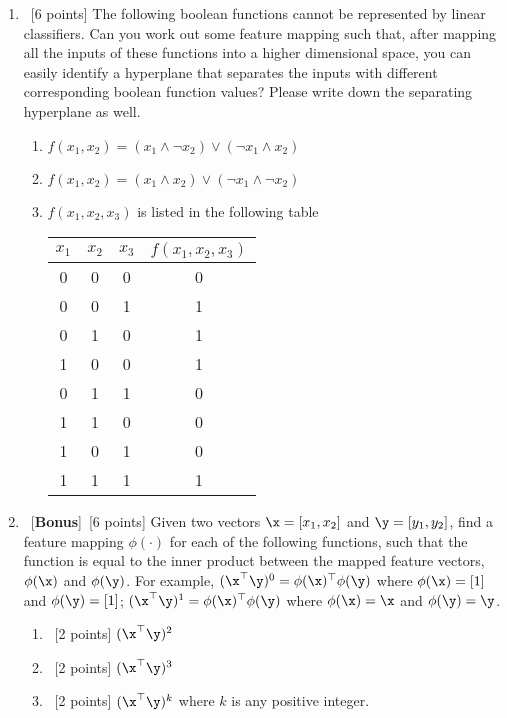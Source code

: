 \documentclass[12pt, fullpage,letterpaper]{article}
\begin{document}
\begin{enumerate}
	
	\item~[6 points] The following boolean functions cannot be represented by linear classifiers. Can you work out some feature mapping such that, after mapping all the inputs of these functions into a higher dimensional space, you can easily identify a hyperplane that separates the inputs with different corresponding boolean function values? Please write down the separating hyperplane as well. 
	\begin{enumerate}
		\item $f(x_1, x_2) = (x_1 \land \neg x_2) \lor (\neg x_1 \land x_2) $
		\item $f(x_1, x_2) = (x_1 \land x_2) \lor (\neg x_1 \land \neg x_2)$
		\item $f(x_1, x_2, x_3)$ is listed in the following table
		\begin{table}[h]
			\centering
			\begin{tabular}{ccc|c}
				$x_1$ & $x_2$ & $x_3$ &  $f(x_1, x_2, x_3)$\\ 
				\hline\hline
				0 & 0 & 0 & 0 \\ \hline
				0 & 0 & 1 & 1 \\ \hline
				0 & 1 & 0 & 1 \\ \hline
				1 & 0 & 0 & 1 \\ \hline
				0 & 1 & 1 & 0\\ \hline
				1 & 1 & 0 & 0\\ \hline
				1 & 0 & 1 & 0\\ \hline
				1 & 1 & 1 & 1\\ \hline
			\end{tabular}
		\end{table}
	\end{enumerate}
	
	\item~[\textbf{Bonus}]~[6 points]  Given two vectors $\x = [x_1,  x_2]$ and $\y=[y_1,  y_2]$, find a feature mapping $\phi(\cdot)$ for each of the following functions, such that the function is equal to the inner product between the mapped feature vectors, $\phi(\x)$ and $\phi(\y)$. For example, $(\x^\top \y)^0 = \phi(\x)^\top \phi(\y)$ where $\phi(\x) = [1]$ and $\phi(\y) = [1]$; $(\x^\top \y)^1 = \phi(\x)^\top \phi(\y)$ where $\phi(\x) = \x$ and $\phi(\y) = \y$. 
	\begin{enumerate}
		\item~[2 points] $(\x^\top \y)^2$
		\item~[2 points] $(\x^\top \y)^3$
		\item~[2 points] $(\x^\top \y)^k$ where $k$ is  any positive integer.  
	\end{enumerate}


\end{enumerate}
\end{document}
